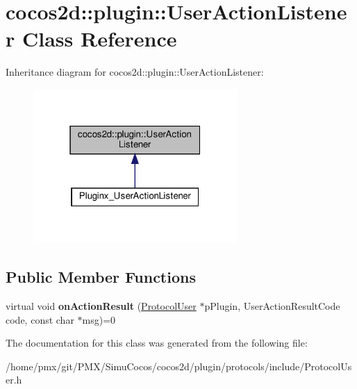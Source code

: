 \hypertarget{classcocos2d_1_1plugin_1_1UserActionListener}{}\section{cocos2d\+:\+:plugin\+:\+:User\+Action\+Listener Class Reference}
\label{classcocos2d_1_1plugin_1_1UserActionListener}


Inheritance diagram for cocos2d\+:\+:plugin\+:\+:User\+Action\+Listener\+:
\nopagebreak
\begin{figure}[H]
\begin{center}
\leavevmode
\includegraphics[width=220pt]{classcocos2d_1_1plugin_1_1UserActionListener__inherit__graph}
\end{center}
\end{figure}
\subsection*{Public Member Functions}
\begin{DoxyCompactItemize}
\item 
\mbox{\label{classcocos2d_1_1plugin_1_1UserActionListener_a71270226310bf21dc3822154b6c4f275}} 
virtual void {\bfseries on\+Action\+Result} (\hyperlink{classcocos2d_1_1plugin_1_1ProtocolUser}{Protocol\+User} $\ast$p\+Plugin, User\+Action\+Result\+Code code, const char $\ast$msg)=0
\end{DoxyCompactItemize}


The documentation for this class was generated from the following file\+:\begin{DoxyCompactItemize}
\item 
/home/pmx/git/\+P\+M\+X/\+Simu\+Cocos/cocos2d/plugin/protocols/include/Protocol\+User.\+h\end{DoxyCompactItemize}
